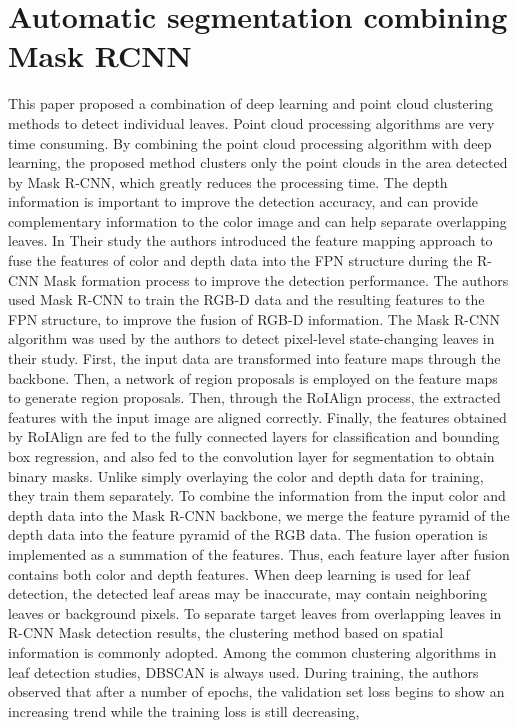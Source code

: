 \section{Automatic segmentation combining Mask RCNN}
This paper proposed a combination of deep learning and point cloud clustering methods to detect individual leaves. Point cloud processing algorithms are very time
consuming. By combining the point cloud processing algorithm with deep learning, the proposed method clusters only the point clouds in the area detected by Mask R-CNN,
which greatly reduces the processing time. The depth information is important to improve the detection accuracy, and can provide complementary information to the color
image and can help separate overlapping leaves. In Their study the authors introduced the feature mapping approach to fuse the features of color and depth data into the FPN
structure during the R-CNN Mask formation process to improve the detection performance. The authors used Mask R-CNN to train the RGB-D data and the resulting features
to the FPN structure, to improve the fusion of RGB-D information. The Mask R-CNN algorithm was used by the authors to detect pixel-level state-changing leaves in their
study. First, the input data are transformed into feature maps through the backbone. Then, a network of region proposals is employed on the feature maps to generate
region proposals. Then, through the RoIAlign process, the extracted features with the input image are aligned correctly. Finally, the features obtained by RoIAlign are
fed to the fully connected layers for classification and bounding box regression, and also fed to the convolution layer for segmentation to obtain binary masks.
Unlike simply overlaying the color and depth data for training, they train them separately. To combine the information from the input color and depth data into
the Mask R-CNN backbone, we merge the feature pyramid of the depth data into the feature pyramid of the RGB data. The fusion operation is implemented as a summation
of the features. Thus, each feature layer after fusion contains both color and depth features. When deep learning is used for leaf detection, the detected leaf areas
may be inaccurate, may contain neighboring leaves or background pixels. To separate target leaves from overlapping leaves in R-CNN Mask detection results, the clustering
method based on spatial information is commonly adopted. Among the common clustering algorithms in leaf detection studies, DBSCAN is always used.
During training, the authors observed that after a number of epochs, the validation set loss begins to show an increasing trend while the training loss is still decreasing,
